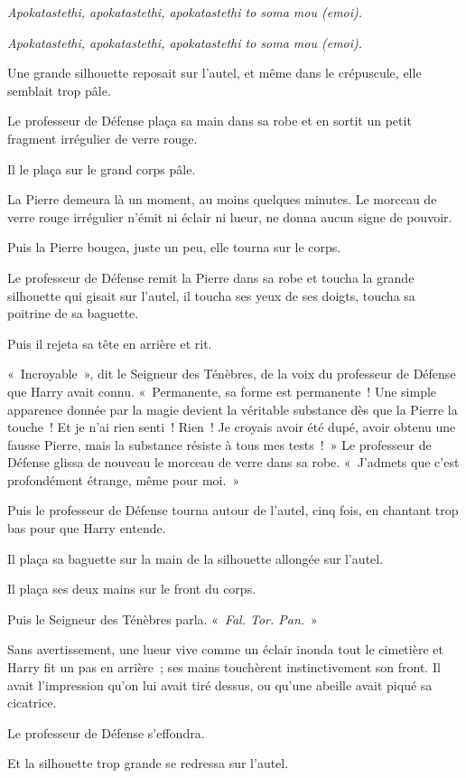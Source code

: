 \emph{Apokatastethi, apokatastethi, apokatastethi to soma mou (emoi).}

\emph{Apokatastethi, apokatastethi, apokatastethi to soma mou (emoi).}

Une grande silhouette reposait sur l'autel, et même dans le crépuscule, elle semblait trop pâle.

Le professeur de Défense plaça sa main dans sa robe et en sortit un petit fragment irrégulier de verre rouge.

Il le plaça sur le grand corps pâle.

La Pierre demeura là un moment, au moins quelques minutes.
Le morceau de verre rouge irrégulier n'émit ni éclair ni lueur, ne donna aucun signe de pouvoir.

Puis la Pierre bougea, juste un peu, elle tourna sur le corps.

Le professeur de Défense remit la Pierre dans sa robe et toucha la grande silhouette qui gisait sur l'autel, il toucha ses yeux de ses doigts, toucha sa poitrine de sa baguette.

Puis il rejeta sa tête en arrière et rit.

«~Incroyable~», dit le Seigneur des Ténèbres, de la voix du professeur de Défense que Harry avait connu.
«~Permanente, sa forme est permanente~!
Une simple apparence donnée par la magie devient la véritable substance dès que la Pierre la touche~!
Et je n'ai rien senti~!
Rien~! Je croyais avoir été dupé, avoir obtenu une fausse Pierre, mais la substance résiste à tous mes tests~!~»
Le professeur de Défense glissa de nouveau le morceau de verre dans sa robe.
«~J'admets que c'est profondément étrange, même pour moi.~»

Puis le professeur de Défense tourna autour de l'autel, cinq fois, en chantant trop bas pour que Harry entende.

Il plaça sa baguette sur la main de la silhouette allongée sur l'autel.

Il plaça ses deux mains sur le front du corps.

Puis le Seigneur des Ténèbres parla.
«~\emph{Fal.
Tor. Pan.}~»

Sans avertissement, une lueur vive comme un éclair inonda tout le cimetière et Harry fit un pas en arrière~; ses mains touchèrent instinctivement son front.
Il avait l'impression qu'on lui avait tiré dessus, ou qu'une abeille avait piqué sa cicatrice.

Le professeur de Défense s'effondra.

Et la silhouette trop grande se redressa sur l'autel.

